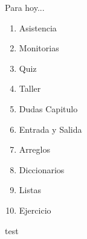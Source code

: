 \begin{frame}{Para hoy...}
	\begin{enumerate}
		\item Asistencia
		\item Monitorias
		\item Quiz
		\item Taller
		\item Dudas Capitulo
		\item Entrada y Salida
		\item Arreglos
		\item Diccionarios
		\item Listas
		\item Ejercicio
	\end{enumerate}
\end{frame}

\begin{frame}{}
	test\cite{sergiomonsalve}

\end{frame}

